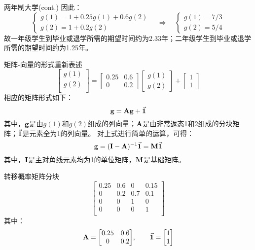 \documentclass[t]{beamer}
\begin{document}
\begin{frame}{两年制大学(cont.)}
        因此：
    \[\begin{cases}
    g(1)=1+0.25g(1)+0.6g(2)\\
    g(2)=1+0.2g(2)
    \end{cases}\quad\Rightarrow\quad\begin{cases}
    g(1)=7/3\\
    g(2)=5/4
    \end{cases} \]
    故一年级学生到毕业或退学所需的期望时间约为2.33年；二年级学生到毕业或退学所需的期望时间约为1.25年。
\end{frame}

\begin{frame}{矩阵-向量的形式重新表述}
    \[\begin{bmatrix}
        g(1)\\
        g(2)\\
        \end{bmatrix}=\begin{bmatrix}
        0.25 & 0.6\\
        0 &0.2
        \end{bmatrix}\begin{bmatrix}
        g(1)\\g(2)
        \end{bmatrix}+\begin{bmatrix}
        1\\1
        \end{bmatrix} \]
        相应的矩阵形式如下：
        \begin{equation*}
        {\bf g}={\bf Ag}+\vec{\bf 1} 
        \end{equation*}
        其中，${\bf g}$是由$g(1)$和$g(2)$组成的列向量；${\bf A}$是由非常返态1和2组成的分块矩阵；$\vec{\bf 1}$是元素全为1的列向量。
        对上式进行简单的运算，可得：
\begin{equation*}
{\bf g}=({\bf I}-{\bf A})^{-1}\vec{\bf 1}={\bf M}\vec{\bf 1}
\end{equation*}
其中，${\bf I}$是主对角线元素均为1的单位矩阵，${\bf M}$是基础矩阵。
\end{frame}

\begin{frame}{转移概率矩阵分块}
    \[\left[\begin{array}{cc|c|c}
        0.25 &      0.6&    0&    0.15 \\
        0   &      0.2&  0.7&    0.1\\\hline
        0  &        0&    1&    0      \\
        0    &       0 &   0 &        1 \\
        \end{array}\right] \]
        其中：\[{{\bf A}=\begin{bmatrix}
            0.25&0.6\\0&0.2
            \end{bmatrix}},\qquad {\vec{\bf 1}=\begin{bmatrix}
            1\\1
            \end{bmatrix}}\]
\end{frame}
\end{document}
